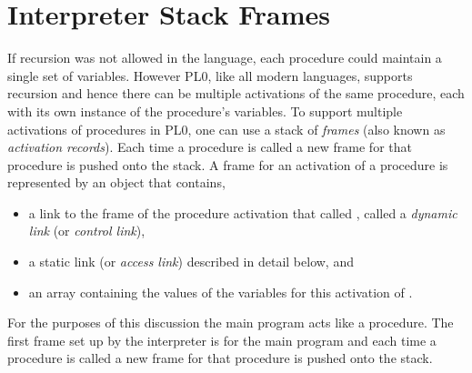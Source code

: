 \documentclass[a4paper,twoside]{article}
\begin{document}
\section{Interpreter Stack Frames}\label{section:frame}

If recursion was not allowed in the language,
each procedure could maintain a single set of variables.
However PL0, like all modern languages, supports recursion
and hence there can be multiple activations of the same procedure,
each with its own instance of the procedure's variables.
To support multiple activations of procedures in PL0,
one can use a stack of \emph{frames}
(also known as \emph{activation records}).
Each time a procedure is called 
a new frame for that procedure is pushed onto the stack.
A frame for an activation of a procedure  
is represented by an object that contains,
\begin{itemize}
\item
a link to the frame of the procedure activation that called ,
called a \emph{dynamic link} (or \emph{control link}),
\item
a static link (or \emph{access link}) described  in detail below,
and 
\item
an array containing the values of the variables for this activation of .
\end{itemize}
For the purposes of this discussion the main program acts like a procedure.
The first frame set up by the interpreter is for the main program and 
each time a procedure is called a new frame for that procedure is pushed onto the stack.
%
\end{document}
